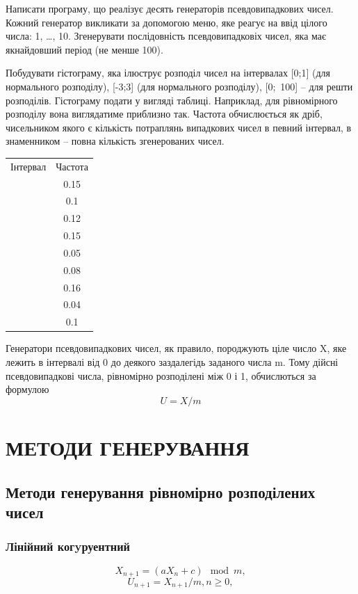 \documentclass[a4paper,12pt]{report}
\begin{document}
Написати програму, що реалізує десять генераторів псевдовипадкових чисел.
Кожний генератор викликати за допомогою меню, яке реагує на ввід цілого числа:
1, \ldots, 10. Згенерувати послідовність псевдовипадковіх чисел, яка має якнайдовший
період (не менше 100). \par
Побудувати гістограму, яка ілюструє розподіл чисел на інтервалах \mbox{[0;1]} (для
нормального розподілу), \mbox{[-3;3]} (для нормального розподілу), \mbox{[0; 100]} – для решти
розподілів. Гістограму подати у вигляді таблиці. Наприклад, для рівномірного
розподілу вона виглядатиме приблизно так. Частота обчислюється як дріб,
чисельником якого є кількість потраплянь випадкових чисел в певний інтервал, в
знаменником – повна кількість згенерованих чисел.
\begin{table}[ht]
\centering %
\begin{tabular}{c c} %
  Інтервал & Частота \\\relax
  [0.1;0.2] & 0.15 \\\relax
  [0.2;0.3] & 0.1 \\\relax
  [0.3;0.4] & 0.12 \\\relax
  [0.4;0.5] & 0.15 \\\relax
  [0.5;0.6] & 0.05 \\\relax
  [0.6;0.7] & 0.08 \\\relax
  [0.7;0.8] & 0.16 \\\relax
  [0.8;0.9] & 0.04 \\\relax
  [0.9;1.0] & 0.1
\end{tabular}
\label{table:nonlin} %
\end{table}

Генератори псевдовипадкових чисел, як правило, породжують ціле число X, яке
лежить в інтервалі від 0 до деякого заздалегідь заданого числа m. Тому дійсні
псевдовипадкові числа, рівномірно розподілені між 0 і 1, обчислються за формулою \[U = X/m\]
\clearpage

\chapter*{МЕТОДИ ГЕНЕРУВАННЯ}
\section{Методи генерування рівномірно розподілених чисел}
\subsection{Лінійний когyруентний}
\[X_{n+1}=(aX_{n} + c )\mod m,\]
\[U_{n+1} = X_{n+1}/m, n\ge0, \]
\end{document}
